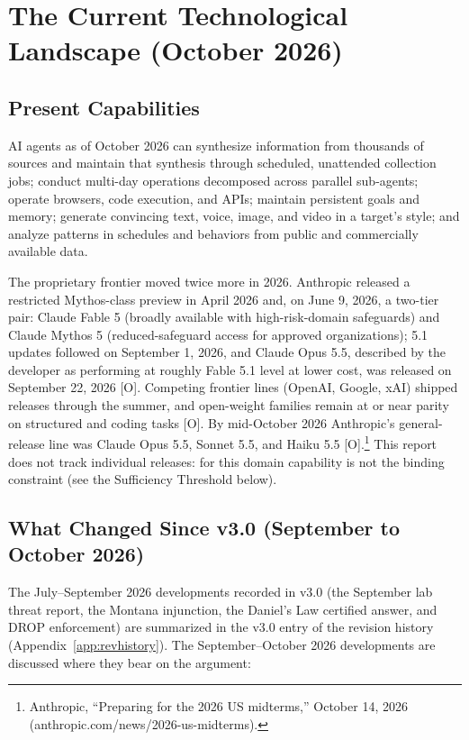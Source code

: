 \documentclass[11pt,letterpaper]{article}
\begin{document}
\section{The Current Technological Landscape (October 2026)}

\subsection{Present Capabilities}

AI agents as of October 2026 can synthesize information from thousands of sources and maintain that synthesis through scheduled, unattended collection jobs; conduct multi-day operations decomposed across parallel sub-agents; operate browsers, code execution, and APIs; maintain persistent goals and memory; generate convincing text, voice, image, and video in a target's style; and analyze patterns in schedules and behaviors from public and commercially available data.

The proprietary frontier moved twice more in 2026. Anthropic released a restricted Mythos-class preview in April 2026 and, on June 9, 2026, a two-tier pair: Claude Fable 5 (broadly available with high-risk-domain safeguards) and Claude Mythos 5 (reduced-safeguard access for approved organizations); 5.1 updates followed on September 1, 2026, and Claude Opus 5.5, described by the developer as performing at roughly Fable 5.1 level at lower cost, was released on September 22, 2026 [O]. Competing frontier lines (OpenAI, Google, xAI) shipped releases through the summer, and open-weight families remain at or near parity on structured and coding tasks [O]. By mid-October 2026 Anthropic's general-release line was Claude Opus 5.5, Sonnet 5.5, and Haiku 5.5 [O].\footnote{Anthropic, ``Preparing for the 2026 US midterms,'' October 14, 2026 (anthropic.com/news/2026-us-midterms).} This report does not track individual releases: for this domain capability is not the binding constraint (see the Sufficiency Threshold below).

\subsection{What Changed Since v3.0 (September to October 2026)}

The July--September 2026 developments recorded in v3.0 (the September lab threat report, the Montana injunction, the Daniel's Law certified answer, and DROP enforcement) are summarized in the v3.0 entry of the revision history (Appendix~\ref{app:revhistory}). The September--October 2026 developments are discussed where they bear on the argument:
\end{document}
